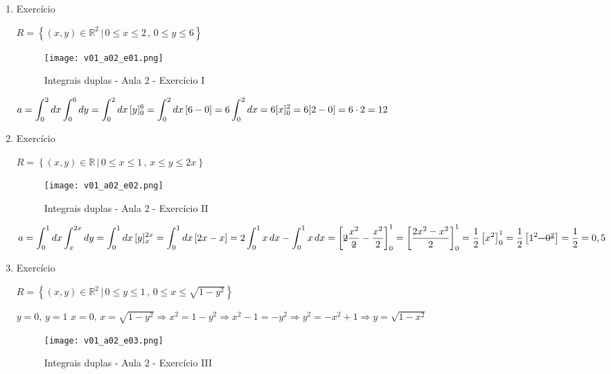 \begin{enumerate}
	\item Exercício
	
	$R = \left\{(x, y) \in \mathbb{R}^2 \,|\, 0 \leq x \leq 2 \,,\, 0 \leq y \leq 6 \right\}$
	
	\begin{figure}[H]
		\centering
		\texttt{[image: v01\_a02\_e01.png]}
		\caption{Integrais duplas - Aula 2 - Exercício I}
		\label{v01_a02_e01}
	\end{figure}
	
	$a = \displaystyle\int_0^2 dx \displaystyle\int_0^6 dy = \displaystyle\int_0^2 dx\, [y]_0^6 = \displaystyle\int_0^2 dx\, [6 - 0] = 6\displaystyle\int_0^2 dx = 6[x]_0^2 = 6[2 - 0] = 6 \cdot 2 = 12 $\newline
	
	\item Exercício
	
	$R = \left\{(x, y) \in \mathbb{R} \,|\, 0 \leq x \leq 1 \,,\, x \leq y \leq 2x \right\}$
						
	\begin{figure}[H]
		\centering
		\texttt{[image: v01\_a02\_e02.png]}
		\caption{Integrais duplas - Aula 2 - Exercício II}
		\label{v01_a02_e02}
	\end{figure}
	
	$a = \integral_0^1 dx \integral_{x}^{2x} dy = \integral_0^1 dx\, [y]_{x}^{2x} = \integral_0^1 dx\, [2x - x] = 2\integral_0^1 x\, dx - \integral_0^1 x\, dx = \left[\overstrike{2}\dfrac{x^2}{\overstrike{2}} - \dfrac{x^2}{2}\right]_0^1 = \left[\dfrac{2x^2 - x^2}{2}\right]_0^1 = \dfrac{1}{2}\left[x^2\right]_0^1 = \dfrac{1}{2}\left[1^2 \overstrike{- 0^2}\right] = \dfrac{1}{2} = 0,5 $\newline
	
	\item Exercício
	
	$R = \left\{(x, y) \in \mathbb{R}^2 \,|\, 0 \leq y \leq 1 \,,\, 0 \leq x \leq \sqrt{1 - y^2} \right\}$
	
	$y = 0,\, y=1$\newline
	$x = 0,\, x = \sqrt{1 - y^2} \Rightarrow x^2 = 1 - y^2 \Rightarrow x^2 - 1 = -y^2 \Rightarrow y^2 = -x^2 + 1 \Rightarrow y = \sqrt{1 -x^2}$
					
	\begin{figure}[H]
		\centering
		\texttt{[image: v01\_a02\_e03.png]}
		\caption{Integrais duplas - Aula 2 - Exercício III}
		\label{v01_a02_e03}
	\end{figure}
	

\end{enumerate}

